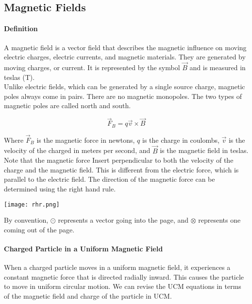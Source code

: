 \subsection{Magnetic Fields}
\hrulefill

\paragraph*{Definition}
    A magnetic field is a vector field that describes the magnetic influence on moving electric charges, 
electric currents, and magnetic materials. They are generated by moving charges, or current. 
It is represented by the symbol $\vec{B}$ and is measured in teslas (T).\\

    Unlike electric fields, which can be generated by a single source charge, magnetic poles always come in pairs. 
There are no magnetic monopoles. The two types of magnetic poles are called north and south.

\begin{equation*}
    \vec{F}_B = q\vec{v} \times \vec{B}
\end{equation*}

    Where $\vec{F}_B$ is the magnetic force in newtons, $q$ is the charge in coulombs, $\vec{v}$ is the velocity
of the charged in meters per second, and $\vec{B}$ is the magnetic field in teslas.\\

    Note that the magnetic force Insert perpendicular to both the velocity of the charge and the magnetic field. 
This is different from the electric force, which is parallel to the electric field. The direction of the magnetic 
force can be determined using the right hand rule.\\

\begin{center}
    \texttt{[image: rhr.png]}
\end{center}

By convention, $\odot$ represents a vector going into the page, and $\otimes$ represents one coming out of the page.


\paragraph{Charged Particle in a Uniform Magnetic Field}
When a charged particle moves in a uniform magnetic field, it experiences a constant magnetic force that is directed
radially inward. This causes the particle to move in uniform circular motion. We can revise the UCM equations in terms
of the magnetic field and charge of the particle in UCM.

